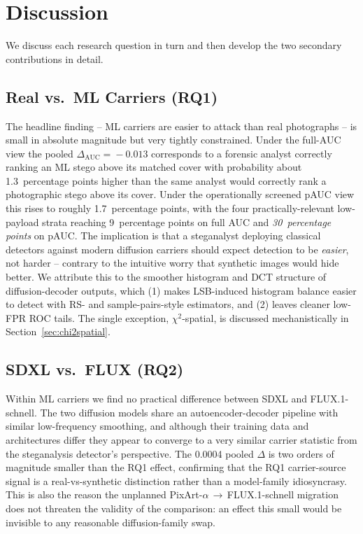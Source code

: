\documentclass[10pt,twocolumn,a4paper]{article}
\begin{document}
\section{Discussion}
\label{sec:discussion}

We discuss each research question in turn and then develop the two secondary contributions in detail.

\subsection{Real vs.\ ML Carriers (RQ1)}

The headline finding -- ML carriers are easier to attack than real photographs -- is small in absolute magnitude but very tightly constrained. Under the full-AUC view the pooled $\Delta_\text{AUC}\!=\!-0.013$ corresponds to a forensic analyst correctly ranking an ML stego above its matched cover with probability about 1.3~percentage points higher than the same analyst would correctly rank a photographic stego above its cover. Under the operationally screened pAUC view this rises to roughly 1.7~percentage points, with the four practically-relevant low-payload strata reaching 9~percentage points on full AUC and \emph{30~percentage points} on pAUC. The implication is that a steganalyst deploying classical detectors against modern diffusion carriers should expect detection to be \emph{easier}, not harder -- contrary to the intuitive worry that synthetic images would hide better. We attribute this to the smoother histogram and DCT structure of diffusion-decoder outputs, which (1) makes LSB-induced histogram balance easier to detect with RS- and sample-pairs-style estimators, and (2) leaves cleaner low-FPR ROC tails. The single exception, $\chi^2$-spatial, is discussed mechanistically in Section~\ref{sec:chi2spatial}.

\subsection{SDXL vs.\ FLUX (RQ2)}

Within ML carriers we find no practical difference between SDXL and FLUX.1-schnell. The two diffusion models share an autoencoder-decoder pipeline with similar low-frequency smoothing, and although their training data and architectures differ they appear to converge to a very similar carrier statistic from the steganalysis detector's perspective. The 0.0004 pooled $\Delta$ is two orders of magnitude smaller than the RQ1 effect, confirming that the RQ1 carrier-source signal is a real-vs-synthetic distinction rather than a model-family idiosyncrasy. This is also the reason the unplanned PixArt-$\alpha$\,$\to$\,FLUX.1-schnell migration does not threaten the validity of the comparison: an effect this small would be invisible to any reasonable diffusion-family swap.
\end{document}
